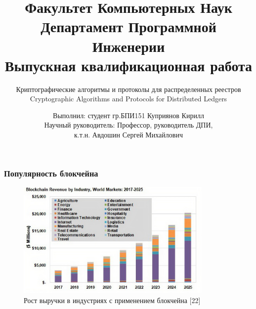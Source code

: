 \documentclass{beamer}
\title[Заголовок]{\footnotesize Факультет Компьютерных Наук\\Департамент
Программной Инженерии\\Выпускная квалификационная работа}
\subtitle{Криптографические алгоритмы и протоколы для распределенных реестров\\
Cryptographic Algorithms and Protocols for Distributed Ledgers}
\author[Куприянов К.И.]{\scriptsize Выполнил: студент
гр.БПИ151 Куприянов Кирилл\\Научный руководитель: Профессор, руководитель ДПИ,\\к.т.н. Авдошин Сергей Михайлович}
\institute[Высшая школа экономики]{}
\date{\the\year}
\begin{document}
\frame[plain]{
    \maketitle
}



\begin{frame}
\frametitle{Популярность блокчейна}
    \begin{figure}
        \includegraphics[width=0.85\textwidth]{graph}
        \caption{\small Рост выручки в индустриях с применением блокчейна [22]}
    \end{figure}


\end{frame}
\end{document}

